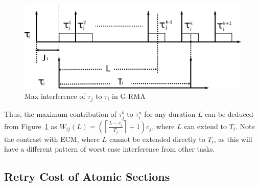 \documentclass[12pt,english]{report}
\begin{document}
\begin{figure}[htbp]
\centering
\includegraphics[scale=0.5]{figures/figure11}\caption{\label{fig11}Max interference of $\tau_{j}$ to $\tau_{i}$ in G-RMA}
\end{figure}

Thus, the maximum contribution of $\tau_{j}^b$ to $\tau_{i}^a$ for any duration
$L$ can be deduced from Figure~\ref{fig11} as $W_{ij}(L)=\left(\left\lceil\frac{L-c_{j}}{T_{j}}\right\rceil+1 \right)c_{j}$,
where $L$ can extend to $T_{i}$. Note the contrast with ECM, where $L$ cannot be extended directly to $T_i$, as this will have a different pattern of worst case interference from other tasks.

\subsection{Retry Cost of Atomic Sections}
\end{document}

